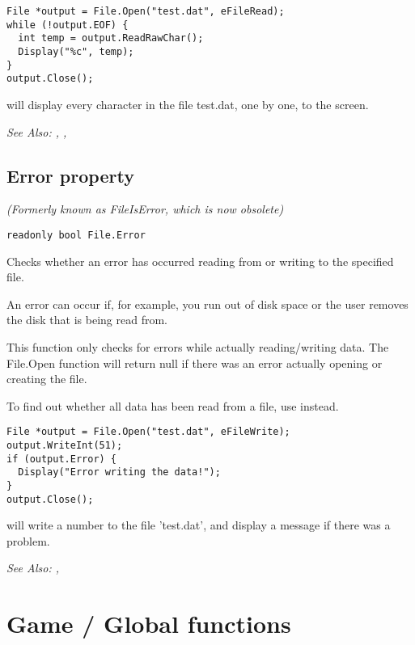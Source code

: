 \begin{verbatim}
File *output = File.Open("test.dat", eFileRead);
while (!output.EOF) {
  int temp = output.ReadRawChar();
  Display("%c", temp);
}
output.Close();
\end{verbatim}
will display every character in the file test.dat, one by one, to the screen.

\it{See Also:} , ,


\subsection{Error property}\label{File.Error}%

\it{(Formerly known as FileIsError, which is now obsolete)}

\begin{verbatim}
readonly bool File.Error
\end{verbatim}
Checks whether an error has occurred reading from or writing to the specified file.

An error can occur if, for example, you run out of disk space or the user removes the
disk that is being read from.

This function only checks for errors while actually reading/writing data. The File.Open
function will return null if there was an error actually opening or creating the file.

To find out whether all data has been read from a file, use  instead.

\begin{verbatim}
File *output = File.Open("test.dat", eFileWrite);
output.WriteInt(51);
if (output.Error) {
  Display("Error writing the data!");
}
output.Close();
\end{verbatim}
will write a number to the file 'test.dat', and display a message if there was a problem.

\it{See Also:} , 



\section{Game / Global functions}\label{GlobalCommands}%



